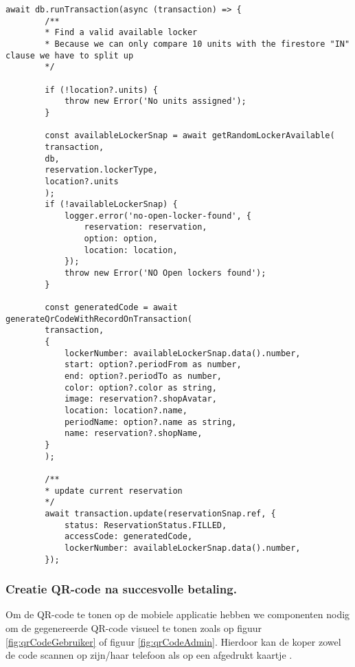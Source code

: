 \begin{lstlisting}[caption={Voltooide betaling roept de creatie QR-code methode op. Hierbij gebeurt een status update van de vooraf aangemaakte reservatie.}, label={lst:voltooidebetaling}]
    await db.runTransaction(async (transaction) => {
        /**
        * Find a valid available locker
        * Because we can only compare 10 units with the firestore "IN" clause we have to split up
        */
        
        if (!location?.units) {
            throw new Error('No units assigned');
        }
        
        const availableLockerSnap = await getRandomLockerAvailable(
        transaction,
        db,
        reservation.lockerType,
        location?.units
        );
        if (!availableLockerSnap) {
            logger.error('no-open-locker-found', {
                reservation: reservation,
                option: option,
                location: location,
            });
            throw new Error('NO Open lockers found');
        }
        
        const generatedCode = await generateQrCodeWithRecordOnTransaction(
        transaction,
        {
            lockerNumber: availableLockerSnap.data().number,
            start: option?.periodFrom as number,
            end: option?.periodTo as number,
            color: option?.color as string,
            image: reservation?.shopAvatar,
            location: location?.name,
            periodName: option?.name as string,
            name: reservation?.shopName,
        }
        );
        
        /**
        * update current reservation
        */
        await transaction.update(reservationSnap.ref, {
            status: ReservationStatus.FILLED,
            accessCode: generatedCode,
            lockerNumber: availableLockerSnap.data().number,
        });
\end{lstlisting}


\subsubsection{Creatie QR-code na succesvolle betaling.}%
\label{sec:opbouwQR-codeVerkoop123}

Om de QR-code te tonen op de mobiele applicatie hebben we componenten nodig om de gegenereerde QR-code visueel te tonen zoals op figuur \ref{fig:qrCodeGebruiker} of figuur \ref{fig:qrCodeAdmin}. Hierdoor kan de koper zowel de code scannen op zijn/haar telefoon als op een afgedrukt kaartje \autocite{Chow2016}.

